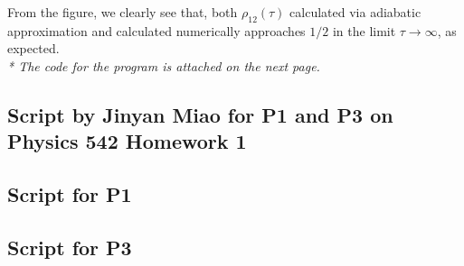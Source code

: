 \documentclass[11pt, oneside]{book}
\theoremstyle{break}
\theoremstyle{break}
\begin{document}
From the figure, we clearly see that, both $\rho_{12}(\tau)$ calculated via adiabatic approximation and calculated numerically approaches $1/2$ in the limit $\tau \to \infty$, as expected.\\

\textit{* The code for the program is attached on the next page.}

\newpage
\subsection*{Script by Jinyan Miao for P1 and P3 on Physics 542 Homework 1}
\subsection*{Script for P1}
\lstset{style=mystyle}

\hfill\break
\hfill\break
\subsection*{Script for P3}
\lstset{style=mystyle}

\end{document}
